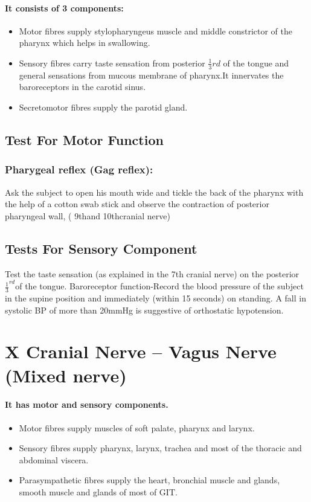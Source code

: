 \documentclass[a4paper,12pt,openany,oneside]{book}
\begin{document}
\paragraph{It consists of 3 components:}
\begin{itemize}
\item[]Motor fibres supply stylopharyngeus muscle and middle constrictor of the pharynx which helps in swallowing.
\item[]Sensory fibres carry taste sensation from posterior $\frac{1}{3}$${rd}$ of the tongue and general sensations from mucous membrane of pharynx.It innervates the baroreceptors in the carotid sinus.
\item[]Secretomotor fibres supply the parotid gland.
\end{itemize}

\subsection*{Test For Motor Function}
\subsubsection*{Pharygeal reflex (Gag reflex):}
Ask the subject to open his mouth wide and tickle the back of the pharynx with the help of a cotton swab stick and observe the contraction of posterior pharyngeal wall, ( 9thand 10thcranial nerve)

\subsection*{Tests For Sensory Component}
Test the taste sensation (as explained in the 7th cranial nerve) on the posterior $\frac{1}{3}^{rd}$of the tongue.
Baroreceptor function-Record the blood pressure of the subject in the supine position and immediately (within 15 seconds) on standing. A fall in systolic BP of more than 20mmHg is suggestive of orthostatic hypotension.

\section*{X Cranial Nerve – Vagus Nerve (Mixed nerve)}
\paragraph{It has motor and sensory components.}
\begin{itemize}
\item[]Motor fibres supply muscles of soft palate, pharynx and larynx.
\item[]Sensory fibres supply pharynx, larynx, trachea and most of the thoracic and abdominal viscera.
\item[]Parasympathetic fibres supply the heart, bronchial muscle and glands, smooth muscle and glands of most of GIT.
\end{itemize}
\end{document}
